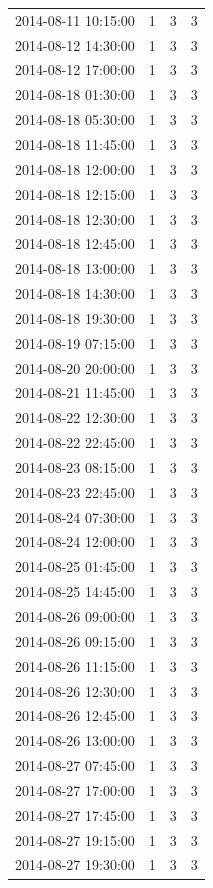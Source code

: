 \begin{tabular}{lrrr}
2014-08-11 10:15:00 & 1 & 3 & 3 \\
2014-08-12 14:30:00 & 1 & 3 & 3 \\
2014-08-12 17:00:00 & 1 & 3 & 3 \\
2014-08-18 01:30:00 & 1 & 3 & 3 \\
2014-08-18 05:30:00 & 1 & 3 & 3 \\
2014-08-18 11:45:00 & 1 & 3 & 3 \\
2014-08-18 12:00:00 & 1 & 3 & 3 \\
2014-08-18 12:15:00 & 1 & 3 & 3 \\
2014-08-18 12:30:00 & 1 & 3 & 3 \\
2014-08-18 12:45:00 & 1 & 3 & 3 \\
2014-08-18 13:00:00 & 1 & 3 & 3 \\
2014-08-18 14:30:00 & 1 & 3 & 3 \\
2014-08-18 19:30:00 & 1 & 3 & 3 \\
2014-08-19 07:15:00 & 1 & 3 & 3 \\
2014-08-20 20:00:00 & 1 & 3 & 3 \\
2014-08-21 11:45:00 & 1 & 3 & 3 \\
2014-08-22 12:30:00 & 1 & 3 & 3 \\
2014-08-22 22:45:00 & 1 & 3 & 3 \\
2014-08-23 08:15:00 & 1 & 3 & 3 \\
2014-08-23 22:45:00 & 1 & 3 & 3 \\
2014-08-24 07:30:00 & 1 & 3 & 3 \\
2014-08-24 12:00:00 & 1 & 3 & 3 \\
2014-08-25 01:45:00 & 1 & 3 & 3 \\
2014-08-25 14:45:00 & 1 & 3 & 3 \\
2014-08-26 09:00:00 & 1 & 3 & 3 \\
2014-08-26 09:15:00 & 1 & 3 & 3 \\
2014-08-26 11:15:00 & 1 & 3 & 3 \\
2014-08-26 12:30:00 & 1 & 3 & 3 \\
2014-08-26 12:45:00 & 1 & 3 & 3 \\
2014-08-26 13:00:00 & 1 & 3 & 3 \\
2014-08-27 07:45:00 & 1 & 3 & 3 \\
2014-08-27 17:00:00 & 1 & 3 & 3 \\
2014-08-27 17:45:00 & 1 & 3 & 3 \\
2014-08-27 19:15:00 & 1 & 3 & 3 \\
2014-08-27 19:30:00 & 1 & 3 & 3 \\

\end{tabular}
